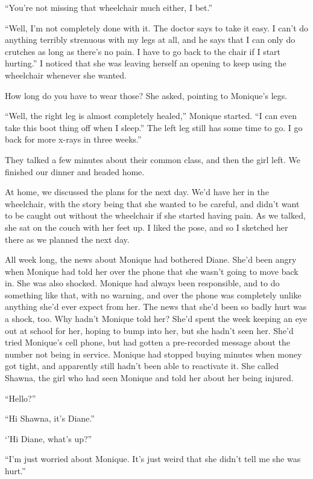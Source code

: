 ``You're not missing that wheelchair much either, I bet.''

``Well, I'm not completely done with it. The doctor says to take it easy. I can't do
anything terribly strenuous with my legs at all, and he says that I can only do crutches as long
as there's no pain. I have to go back to the chair if I start hurting.'' I noticed that she was
leaving herself an opening to keep using the wheelchair whenever she wanted.

How long do you have to wear those? She asked, pointing to Monique's legs.

``Well, the right leg is almost completely healed,'' Monique started. ``I can even take this
boot thing off when I sleep.'' The left leg still has some time to go. I go back for more x-rays
in three weeks.''

They talked a few minutes about their common class, and then the girl left. We finished our
dinner and headed home.

At home, we discussed the plans for the next day. We'd have her in the wheelchair, with the
story being that she wanted to be careful, and didn't want to be caught out without the
wheelchair if she started having pain. As we talked, she sat on the couch with her feet up. I
liked the pose, and so I sketched her there as we planned the next day.

All week long, the news about Monique had bothered Diane. She'd been angry when Monique had
told her over the phone that she wasn't going to move back in. She was also shocked. Monique had
always been responsible, and to do something like that, with no warning, and over the phone was
completely unlike anything she'd ever expect from her. The news that she'd been so badly hurt
was a shock, too. Why hadn't Monique told her? She'd spent the week keeping an eye out at school
for her, hoping to bump into her, but she hadn't seen her. She'd tried Monique's cell phone, but
had gotten a pre-recorded message about the number not being in service. Monique had stopped
buying minutes when money got tight, and apparently still hadn't been able to reactivate it. She
called Shawna, the girl who had seen Monique and told her about her being injured.

``Hello?''

``Hi Shawna, it's Diane.''

‘'Hi Diane, what's up?''

``I'm just worried about Monique. It's just weird that she didn't tell me she was hurt.''

